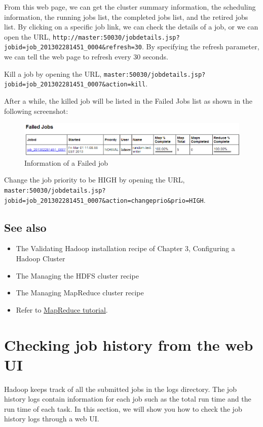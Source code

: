 From this web page, we can get the cluster summary information, the scheduling information, the running jobs list, the completed jobs list, and the retired jobs list. By clicking on a specific job link, we can check the details of a job, or we can open the URL, \verb|http://master:50030/jobdetails.jsp?jobid=job_201302281451_0004&refresh=30|. By specifying the refresh parameter, we can tell the web page to refresh every 30 seconds.

Kill a job by opening the URL, \verb|master:50030/jobdetails.jsp?jobid=job_201302281451_0007&action=kill|.

After a while, the killed job will be listed in the Failed Jobs list as shown in the following screenshot:
\begin{figure}[h]
  \centering
  \includegraphics[width=\textwidth]{figs/5163OS_04_12.png}
  \caption{Information of a Failed job}\label{fig:failed.job}
\end{figure} 

Change the job priority to be HIGH by opening the URL, \verb|master:50030/jobdetails.jsp?jobid=job_201302281451_0007&action=changeprio&prio=HIGH|. \\
\subsection*{See also}

\begin{itemize}
  \item The Validating Hadoop installation recipe of Chapter 3, Configuring a Hadoop Cluster
  \item The Managing the HDFS cluster recipe
  \item The Managing MapReduce cluster recipe
  \item Refer to \href{http://hadoop.apache.org/docs/r1.1.2/mapred_tutorial.html}{MapReduce tutorial}.
\end{itemize}

\section{Checking job history from the web UI}
Hadoop keeps track of all the submitted jobs in the logs directory. The job history logs contain information for each job such as the total run time and the run time of each task. In this section, we will show you how to check the job history logs through a web UI.
